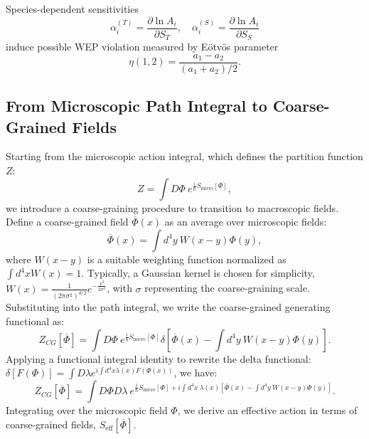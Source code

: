 \documentclass[12pt, a4paper]{article}
\begin{document}
Species-dependent sensitivities
\[
\alpha_i^{(T)} = \frac{\partial \ln A_i}{\partial S_T}, \quad \alpha_i^{(S)} = \frac{\partial \ln A_i}{\partial S_S}
\]
induce possible WEP violation measured by Eötvös parameter
\[
\eta(1,2) = \frac{a_1 - a_2}{(a_1 + a_2)/2}.
\]

\subsection{From Microscopic Path Integral to Coarse-Grained Fields}
Starting from the microscopic action integral, which defines the partition function $Z$:
\begin{equation}
Z=\int D\Phi~e^{\frac{i}{\hbar}S_{\mathrm{micro}}[\Phi]},
\end{equation}
we introduce a coarse-graining procedure to transition to macroscopic fields.
Define a coarse-grained field $\overline{\Phi}(x)$ as an average over microscopic fields:
\begin{equation}
\overline{\Phi}(x)=\int d^4y~W(x-y)\Phi(y),
\end{equation}
where $W(x-y)$ is a suitable weighting function normalized as $\int d^4xW(x)=1$.
Typically, a Gaussian kernel is chosen for simplicity, $W(x)=\frac{1}{(2\pi\sigma^2)^{d/2}}e^{-\frac{x^2}{2\sigma^2}}$, with $\sigma$ representing the coarse-graining scale.
Substituting into the path integral, we write the coarse-grained generating functional as:
\begin{equation}
Z_{CG}[\overline{\Phi}]=\int D\Phi~e^{\frac{i}{\hbar}S_{\mathrm{micro}}[\Phi]}\delta\left[\overline{\Phi}(x)-\int d^4y~W(x-y)\Phi(y)\right].
\end{equation}
Applying a functional integral identity to rewrite the delta functional:
$\delta[F(\Phi)]=\int D\lambda e^{i\int d^4x \lambda(x)F(\Phi(x))}$,
we have:
\begin{equation}
Z_{CG}[\overline{\Phi}] = \int D\Phi D\lambda~e^{\frac{i}{\hbar}S_{\mathrm{micro}}[\Phi]+i\int d^4x~\lambda(x)[\overline{\Phi}(x)-\int d^4y~W(x-y)\Phi(y)]}.
\end{equation}
Integrating over the microscopic field $\Phi$, we derive an effective action in terms of coarse-grained fields, $S_{\text{eff}}[\overline{\Phi}]$.
\end{document}

